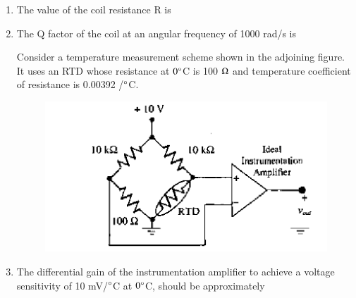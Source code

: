 \documentclass[journal,12pt,onecolumn]{IEEEtran}
\theoremstyle{remark}
\begin{document}
\begin{enumerate}
\item The value of the coil resistance R is

\hfill{}\begin{enumerate}  \end{enumerate}

\item The Q factor of the coil at an angular frequency of 1000 rad/s is

\hfill{}\begin{enumerate}  \end{enumerate}

Consider a temperature measurement scheme shown in the adjoining figure. It uses an RTD whose resistance at $0\degree$C is 100 $\ohm$ and temperature coefficient of resistance \brak{\alpha} is 0.00392 /$\degree$C.
\begin{figure}[H]
    \centering
    \includegraphics[width = 0.7\columnwidth]{q54}
    \caption*{}
    \label{fig:Q54}
\end{figure}


\item The differential gain of the instrumentation amplifier to achieve a voltage sensitivity of 10 mV/$\degree$C at $0\degree$C, should be approximately

\hfill{}\begin{enumerate}  \end{enumerate}


\end{enumerate}
\end{document}
